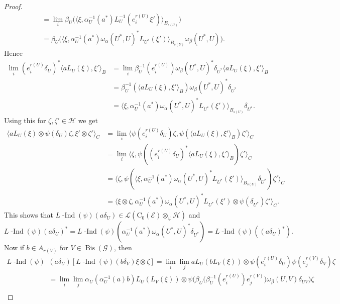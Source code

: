 \documentclass[11 pt, leqno]{amsart}
\numberwithin{equation}{section}
\theoremstyle{plain}
\theoremstyle{definition}
\newcommand*{\contz}{\mathrm{C_0}}%
\DeclareMathOperator{\dashind}{-Ind}
\DeclareMathOperator{\Bis}{Bis}
\renewcommand{\H}{\mathcal H}
\newcommand{\LL}{\mathcal L}
\newcommand{\G}{\mathcal G} %
\newcommand{\EE}{\mathcal E}
\begin{document}
\begin{proof}
\[\begin{split}
        &=\lim_{i}\beta_U\Big(\langle \xi ,  \alpha_U^{-1}(a^*)L_{U}^{-1}(e_i^{r(U)}\xi') \rangle_{B_{s(U)}}\Big) \\
        &=\beta_U\Big(\langle \xi ,  \alpha_U^{-1}(a^*)\omega_{\alpha}(U^*,U)^* L_{U^*}(\xi') \rangle_{B_{s(U)}}\omega_{\beta}(U^*,U)\Big).
\end{split}
\]
Hence
\[
\begin{split}
    \lim_{i}(e_i^{r(U)}\delta_U)^* \langle aL_U(\xi), \xi'\rangle_B &= \lim_{i}\beta_U^{-1}(e_i^{r(U)})\omega_{\beta}(U^*,U)^*\delta_{U^*}\langle aL_U(\xi), \xi'\rangle_B \\
        &= \beta_{U}^{-1}(\langle aL_U(\xi), \xi'\rangle_B) \omega_{\beta}(U^*,U)^*\delta_{U^*} \\
        &=\langle \xi ,  \alpha_U^{-1}(a^*)\omega_{\alpha}(U^*,U)^* L_{U^*}(\xi') \rangle_{B_{s(U)}}\delta_{U^*} .
\end{split}
\]
Using this for $\zeta,\zeta'\in \H$ we get
\[
\begin{split}
    \langle aL_U(\xi)\otimes \psi(\delta_U)\zeta ,\xi'\otimes \zeta' \rangle_{C} &= \lim_{i}\langle \psi(e_i^{r(U)}\delta_U) \zeta, \psi( \langle aL_U(\xi), \xi'\rangle_B)\zeta' \rangle_{C} \\
        &= \lim_{i}\langle  \zeta, \psi((e_i^{r(U)}\delta_U)^* \langle aL_U(\xi), \xi'\rangle_B)\zeta' \rangle_{C} \\
        &=\langle  \zeta, \psi(\langle \xi , \alpha_U^{-1}(a^*)\omega_{\alpha}(U^*,U)^* L_{U^*}(\xi') \rangle_{B_{s(U)}}\delta_{U^*}) \zeta' \rangle_{C} \\
        &= \langle\xi\otimes \zeta,  \alpha_U^{-1}(a^*)\omega_{\alpha}(U^*,U)^* L_{U^*}(\xi') \otimes \psi(\delta_{U^*})\zeta' \rangle_{C}.
\end{split}
\]
This shows that $L\dashind(\psi)(a\delta_U)\in \LL(\contz(\EE)\otimes_{\psi} \H)$ and
\[
    L\dashind(\psi)(a\delta_U)^* = L\dashind(\psi)(\alpha_U^{-1}(a^*)\omega_{\alpha}(U^*,U)^* \delta_{U^*}) = L\dashind(\psi)((a\delta_U)^*) .
\]
Now if $b\in A_{r(V)}$ for $V\in \Bis(\G)$, then
\[
\begin{split}
    L\dashind(\psi)&(a\delta_U) [L\dashind(\psi)(b\delta_V) \xi\otimes \zeta] = \lim_{i}\lim_{j} aL_U(bL_V(\xi)) \otimes \psi(e_{i}^{r(U)} \delta_U) \psi(e_{j}^{r(V)} \delta_V)\zeta \\
        &= \lim_{i} \lim_{j} \alpha_U(\alpha_{U}^{-1}(a)b)L_U(L_V(\xi)) \otimes  \psi \Big( \beta_U\big(\beta_{U}^{-1}(e_{i}^{r(U)})e_{j}^{r(V)}\big)\omega_{\beta}(U,V)\delta_{UV} \Big) \zeta \\

\end{split}\]
\end{proof}
\end{document}
